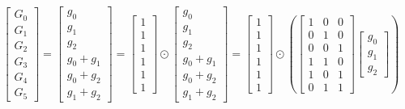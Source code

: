 \documentclass{article}%
\begin{document}
\[%
\left[\begin{matrix}G_{0}\\G_{1}\\G_{2}\\G_{3}\\G_{4}\\G_{5}\end{matrix}\right] = \left[\begin{matrix}g_{0}\\g_{1}\\g_{2}\\g_{0} + g_{1}\\g_{0} + g_{2}\\g_{1} + g_{2}\end{matrix}\right] = \left[\begin{matrix}1\\1\\1\\1\\1\\1\end{matrix}\right] \odot \left[\begin{matrix}g_{0}\\g_{1}\\g_{2}\\g_{0} + g_{1}\\g_{0} + g_{2}\\g_{1} + g_{2}\end{matrix}\right] = \left[\begin{matrix}1\\1\\1\\1\\1\\1\end{matrix}\right] \odot \left( \left[\begin{matrix}1 & 0 & 0\\0 & 1 & 0\\0 & 0 & 1\\1 & 1 & 0\\1 & 0 & 1\\0 & 1 & 1\end{matrix}\right] \left[\begin{matrix}g_{0}\\g_{1}\\g_{2}\end{matrix}\right] \right)%
\]%
\end{document}

